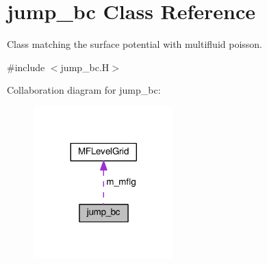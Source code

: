 \hypertarget{classjump__bc}{}\section{jump\+\_\+bc Class Reference}
\label{classjump__bc}


Class matching the surface potential with multifluid poisson.  




{\ttfamily \#include $<$jump\+\_\+bc.\+H$>$}



Collaboration diagram for jump\+\_\+bc\+:\nopagebreak
\begin{figure}[H]
\begin{center}
\leavevmode
\includegraphics[width=152pt]{classjump__bc__coll__graph}
\end{center}
\end{figure}
